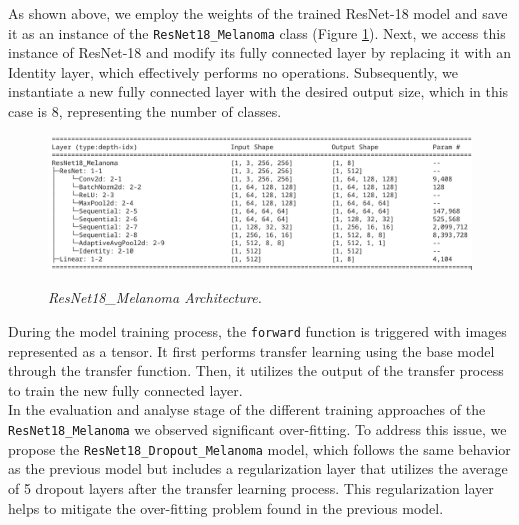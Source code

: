 As shown above, we employ the weights of the trained ResNet-18 model and save
it as an instance of the \texttt{ResNet18\_Melanoma} class (Figure
\ref{fig:resnet-18-melanoma-arch}). Next, we access this instance of ResNet-18
and modify its fully connected layer by replacing it with an Identity layer,
which effectively performs no operations. Subsequently, we instantiate a new
fully connected layer with the desired output size, which in this case is 8,
representing the number of classes.

\begin{figure}[H]
  \centering
  \includegraphics[width=\textwidth]{imatges/methodological_contribution/ResNet18_Melanoma.png}
  \caption[ResNet18\_Melanoma Architecture]{\textit{ResNet18\_Melanoma Architecture. }}
  {\label{fig:resnet-18-melanoma-arch}}
\end{figure}

During the model training process, the {\tt forward} function is triggered with
images represented as a tensor. It first performs transfer learning using the
base model through the transfer function. Then, it utilizes the output of the
transfer process to train the new fully connected layer. \\

In the evaluation and analyse stage of the different training approaches of the
{\tt ResNet18\_Melanoma} we observed significant over-fitting. To address this
issue, we propose the {\tt ResNet18\_Dropout\_Melanoma} model, which follows
the same behavior as the previous model but includes a regularization layer
that utilizes the average of 5 dropout layers after the transfer learning
process. This regularization layer helps to mitigate the over-fitting problem
found in the previous model.

